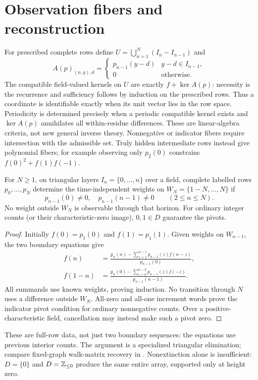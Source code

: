 \section{Observation fibers and reconstruction}
For prescribed complete rows define $U=\bigcup_{n=1}^N(I_n-I_{n-1})$ and
\[
 A(p)_{(n,y),d}=\begin{cases}p_{n-1}(y-d)&y-d\in I_{n-1},\\0&\text{otherwise}.\end{cases}
\]
The compatible field-valued kernels on $U$ are exactly $f+\ker A(p)$: necessity is the recurrence and sufficiency follows by induction on the prescribed rows. Thus a coordinate is identifiable exactly when its unit vector lies in the row space. Periodicity is determined precisely when a periodic compatible kernel exists and $\ker A(p)$ annihilates all within-residue differences. These are linear-algebra criteria, not new general inverse theory. Nonnegative or indicator fibers require intersection with the admissible set. Truly hidden intermediate rows instead give polynomial fibers; for example observing only $p_2(0)$ constrains $f(0)^2+f(1)f(-1)$.

\begin{theorem}\label{thm:inverse}
For $N\ge1$, on triangular layers $I_n=\{0,\ldots,n\}$ over a field, complete labelled rows $p_0,\ldots,p_N$ determine the time-independent weights on $W_N=\{1-N,\ldots,N\}$ if
\[
p_{n-1}(0)\ne0,\quad p_{n-1}(n-1)\ne0\qquad(2\le n\le N).
\]
No weight outside $W_N$ is observable through that horizon. For ordinary integer counts (or their characteristic-zero image), $0,1\in D$ guarantee the pivots.
\end{theorem}
\begin{proof}
Initially $f(0)=p_1(0)$ and $f(1)=p_1(1)$. Given weights on $W_{n-1}$, the two boundary equations give
\begin{align*}
f(n)&=\frac{p_n(n)-\sum_{z=1}^{n-1}p_{n-1}(z)f(n-z)}{p_{n-1}(0)},\\
f(1-n)&=\frac{p_n(0)-\sum_{z=0}^{n-2}p_{n-1}(z)f(-z)}{p_{n-1}(n-1)}.
\end{align*}
All summands use known weights, proving induction. No transition through $N$ uses a difference outside $W_N$. All-zero and all-one increment words prove the indicator pivot condition for ordinary nonnegative counts. Over a positive-characteristic field, cancellation may instead make such a pivot zero.
\end{proof}
These are full-row data, not just two boundary sequences: the equations use previous interior counts. The argument is a specialized triangular elimination; compare fixed-graph walk-matrix recovery in \cite{LiuSiemons}. Nonextinction alone is insufficient: $D=\{0\}$ and $D=\mathbb Z_{\le0}$ produce the same entire array, supported only at height zero.

